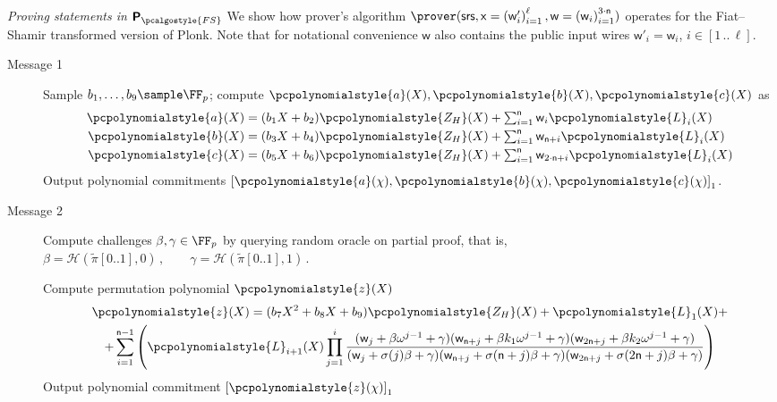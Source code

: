 \documentclass[10pt]{llncs}
\newcommand{\pcvarstyle}[1]{\mathsf{#1}}
\newcommand{\range}[2] {[#1 \, .. \, #2]}
\newcommand{\brak}[1] {\left(#1\right)}
\newcommand{\p}[1]{\pcpolynomialstyle{#1}}
\newcommand{\numberofconstrains}{\pcvarstyle{n}}
\newcommand{\noofc}{\numberofconstrains}
\newcommand{\bmap}[2] {\left[#1\right]_{#2}}
\newcommand{\gone}[1] {\bmap{#1}{1}}
\newcommand{\srs}{\pcvarstyle{srs}}
\newcommand{\zkproof}{\pi}
\newcommand{\tzkproof}{\tilde{\zkproof}}
\newcommand{\ro}{\mathcal{H}}
\newcommand{\instsize}{\pcvarstyle{\ell}}
\newcommand{\fs}{\pcalgostyle{FS}}
\newcommand{\pcschemestyle}[1]{\bm{\mathsf{#1}}}
\newcommand{\plonkprotfs}{\pcschemestyle{P}_\fs}
\newcommand{\lag}{\p{L}}
\newcommand{\inp}{\pcvarstyle{x}}
\newcommand{\wit}{\pcvarstyle{w}}
\newcommand{\ourpar}[1] {\smallskip\noindent\emph{#1}}
\begin{document}
\ourpar{Proving statements in $\plonkprotfs$} We show how prover's algorithm
$\prover(\srs, \inp=\brak{\wit'_i}_{i = 1}^\instsize, \wit = \brak{\wit_i}_{i=1}^{3 \cdot \noofc})$ operates for
the Fiat--Shamir transformed version of Plonk. Note that for notational convenience $\wit$ also contains the public input wires $\wit'_i=\wit_i$, $i\in \range{1}{\ell}$.
\begin{description}
	\item[Message 1] Sample $b_1, \ldots, b_9 \sample \FF_p$; compute
	$\p{a}(X), \p{b}(X), \p{c}(X)$ as
	\begin{align*}
	\p{a}(X) &= (b_1 X + b_2)\p{Z_H}(X) + \textstyle \sum_{i = 1}^{\noofc} \wit_i \lag_i(X) \\
	\p{b}(X) &= (b_3 X + b_4)\p{Z_H}(X) + \textstyle \sum_{i = 1}^{\noofc} \wit_{\noofc + i} \lag_i(X) \\
	\p{c}(X) &= (b_5 X + b_6)\p{Z_H}(X) + \textstyle \sum_{i = 1}^{\noofc} \wit_{2 \cdot \noofc + i} \lag_i(X) 
	\end{align*}
	Output polynomial commitments $\gone{\p{a}(\chi), \p{b}(\chi), \p{c}(\chi)}$.  
	
	\item[Message 2] Compute challenges $\beta, \gamma \in \FF_p$ by querying random oracle
	on partial proof, that is,
	\(
	\beta = \ro(\tzkproof[0..1], 0)\,, \qquad \gamma = \ro(\tzkproof[0..1], 1)\,.
	\)
	
	Compute permutation polynomial $\p{z}(X)$
	\begin{multline*}
	\p{z}(X) = (b_7 X^2 + b_8 X + b_9)\p{Z_H}(X) + \lag_1(X) + \\
	+ \sum_{i = 1}^{\noofc - 1} \left(\lag_{i + 1} (X) \prod_{j = 1}^{i} \frac{
		(\wit_j +\beta \omega^{j - 1} + \gamma)(\wit_{\noofc + j} + \beta k_1
		\omega^{j - 1} + \gamma)(\wit_{2 \noofc + j} +\beta k_2 \omega^{j- 1} +
		\gamma)} {(\wit_j+\sigma(j) \beta + \gamma)(\wit_{\noofc + j} + \sigma(\noofc
		+ j)\beta + \gamma)(\wit_{2 \noofc + j} + \sigma(2 \noofc + j)\beta +
		\gamma)}\right)
	\end{multline*}
	Output polynomial commitment $\gone{\p{z}(\chi)}$
	

\end{description}
\end{document}
